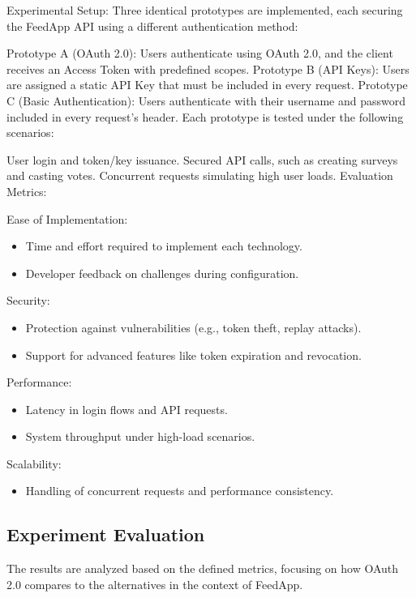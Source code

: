 Experimental Setup: Three identical prototypes are implemented, each securing the FeedApp API using a different authentication method:
\medskip

\noindent
Prototype A (OAuth 2.0):
Users authenticate using OAuth 2.0, and the client receives an Access Token with predefined scopes.
Prototype B (API Keys):
Users are assigned a static API Key that must be included in every request.
Prototype C (Basic Authentication):
Users authenticate with their username and password included in every request’s header.
Each prototype is tested under the following scenarios:
\medskip

\noindent
User login and token/key issuance.
Secured API calls, such as creating surveys and casting votes.
Concurrent requests simulating high user loads.
Evaluation Metrics:
\medskip

\noindent

Ease of Implementation:
\begin{itemize}
	\item  Time and effort required to implement each technology.
	\item  Developer feedback on challenges during configuration.
\end{itemize}
Security:
\begin{itemize}
	\item Protection against vulnerabilities (e.g., token theft, replay attacks).
	\item Support for advanced features like token expiration and revocation.
\end{itemize}
Performance:
\begin{itemize}
	\item  Latency in login flows and API requests.
	\item  System throughput under high-load scenarios.
\end{itemize}
Scalability:
\begin{itemize}
	\item  Handling of concurrent requests and performance consistency.
\end{itemize}
\subsection{Experiment Evaluation}

The results are analyzed based on the defined metrics, focusing on how OAuth 2.0 compares to the alternatives in the context of FeedApp.

